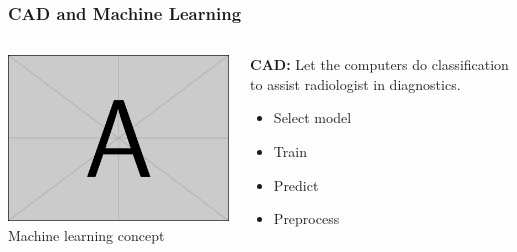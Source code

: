 \documentclass[aspectratio=1610]{beamer}
\begin{document}
\begin{frame}
  \frametitle{\hfill CAD and Machine Learning}
  \begin{columns}[T]
    \begin{column}{.5\textwidth}
      \begin{block}{}
        \includegraphics[width=\textwidth]{images/example-image-a.png}\\
        Machine learning concept
      \end{block}
    \end{column}
    \begin{column}{.5\textwidth}
      \begin{block}{}
        \textbf{CAD:} Let the computers do classification to assist radiologist in diagnostics.
        \begin{itemize}
          \item Select model\pause
          \item Train\pause
          \item Predict\pause
          \item Preprocess\pause
        \end{itemize}
      \end{block}
    \end{column}
  \end{columns}
\end{frame}
\end{document}

